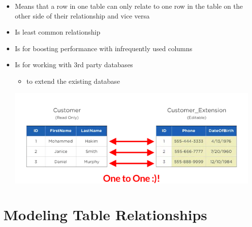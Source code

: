 \documentclass[12pt]{article}
\begin{document}
\begin{itemize}
    \item Means that a row in one table can only relate to one row in the table
    on the other side of their relationship and vice versa
    \item Is least common relationship
    \item Is for boosting performance with infrequently used columns
    \item Is for working with 3rd party databases
    \begin{itemize}
        \item to extend the existing database
    \end{itemize}

    \begin{center}
    \includegraphics[width=0.8\linewidth]{images/part_3_notes_3.png}
    \end{center}
\end{itemize}

\bigskip

\section{Modeling Table Relationships}

\bigskip
\end{document}

